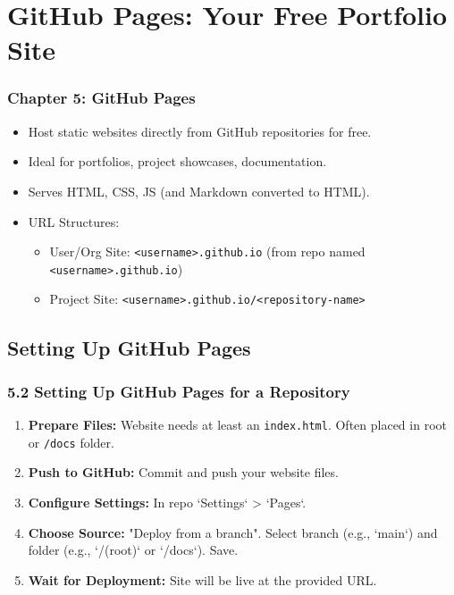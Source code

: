 \documentclass{beamer}
\begin{document}
\section{GitHub Pages: Your Free Portfolio Site}
\begin{frame}
  \frametitle{Chapter 5: GitHub Pages}
  \begin{itemize}
    \item Host static websites directly from GitHub repositories for free.
    \item Ideal for portfolios, project showcases, documentation.
    \item Serves HTML, CSS, JS (and Markdown converted to HTML).
    \item URL Structures:
    \begin{itemize}
        \item User/Org Site: \texttt{<username>.github.io} (from repo named \texttt{<username>.github.io})
        \item Project Site: \texttt{<username>.github.io/<repository-name>}
    \end{itemize}
  \end{itemize}
\end{frame}

\subsection{Setting Up GitHub Pages}
\begin{frame}
  \frametitle{5.2 Setting Up GitHub Pages for a Repository}
  \begin{enumerate}
    \item \textbf{Prepare Files:} Website needs at least an \texttt{index.html}. Often placed in root or \texttt{/docs} folder.
    \item \textbf{Push to GitHub:} Commit and push your website files.
    \item \textbf{Configure Settings:} In repo `Settings` > `Pages`.
    \item \textbf{Choose Source:} "Deploy from a branch". Select branch (e.g., `main`) and folder (e.g., `/(root)` or `/docs`). Save.
    \item \textbf{Wait for Deployment:} Site will be live at the provided URL.
  \end{enumerate}
\end{frame}
\end{document}
